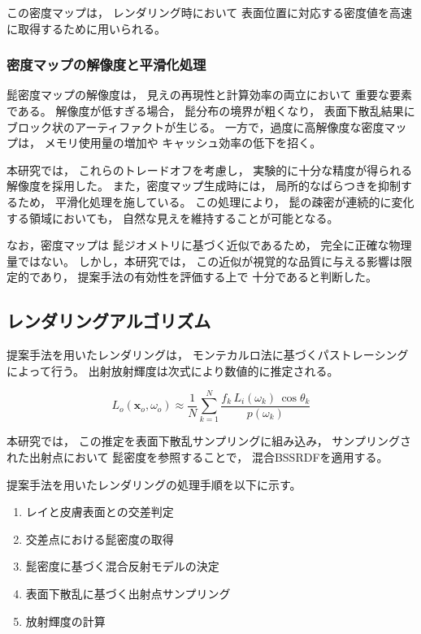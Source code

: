 この密度マップは，
レンダリング時において
表面位置に対応する密度値を高速に取得するために用いられる。
\subsubsection{密度マップの解像度と平滑化処理}
髭密度マップの解像度は，
見えの再現性と計算効率の両立において
重要な要素である。
解像度が低すぎる場合，
髭分布の境界が粗くなり，
表面下散乱結果に
ブロック状のアーティファクトが生じる。
一方で，過度に高解像度な密度マップは，
メモリ使用量の増加や
キャッシュ効率の低下を招く。

本研究では，
これらのトレードオフを考慮し，
実験的に十分な精度が得られる解像度を採用した。
また，密度マップ生成時には，
局所的なばらつきを抑制するため，
平滑化処理を施している。
この処理により，
髭の疎密が連続的に変化する領域においても，
自然な見えを維持することが可能となる。

なお，密度マップは
髭ジオメトリに基づく近似であるため，
完全に正確な物理量ではない。
しかし，本研究では，
この近似が視覚的な品質に与える影響は限定的であり，
提案手法の有効性を評価する上で
十分であると判断した。

\subsection{レンダリングアルゴリズム}
提案手法を用いたレンダリングは，
モンテカルロ法に基づくパストレーシングによって行う。
出射放射輝度は次式により数値的に推定される。

\begin{equation}
L_o(\mathbf{x}_o, \omega_o)
\approx
\frac{1}{N}
\sum_{k=1}^{N}
\frac{f_k\, L_i(\omega_k)\, \cos\theta_k}
     {p(\omega_k)}
\end{equation}

本研究では，
この推定を表面下散乱サンプリングに組み込み，
サンプリングされた出射点において
髭密度を参照することで，
混合BSSRDFを適用する。

提案手法を用いたレンダリングの処理手順を以下に示す。

\begin{enumerate}
  \item レイと皮膚表面との交差判定
  \item 交差点における髭密度の取得
  \item 髭密度に基づく混合反射モデルの決定
  \item 表面下散乱に基づく出射点サンプリング
  \item 放射輝度の計算
\end{enumerate}

